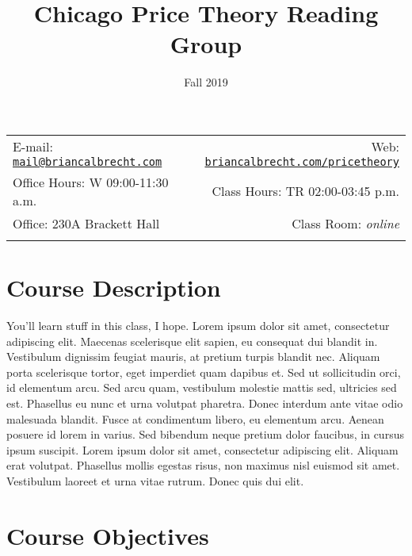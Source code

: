 \documentclass[11pt,]{article}
\title{Chicago Price Theory Reading Group}
\date{Fall 2019}
\begin{document}
  

		\maketitle
		
	
		\thispagestyle{firststyle}



	\noindent \begin{tabular*}{\textwidth}{ @{\extracolsep{\fill}} lr @{\extracolsep{\fill}}}


E-mail: \texttt{\href{mailto:mail@briancalbrecht.com}{\nolinkurl{mail@briancalbrecht.com}}} & Web: \href{http://briancalbrecht.com/pricetheory}{\tt briancalbrecht.com/pricetheory}\\
Office Hours: W 09:00-11:30 a.m.  &  Class Hours: TR 02:00-03:45 p.m.\\
Office: 230A Brackett Hall  & Class Room: \emph{online}\\
	&  \\
	\hline
	\end{tabular*}
	
\vspace{2mm}
	


\hypertarget{course-description}{%
\section{Course Description}\label{course-description}}

You'll learn stuff in this class, I hope. Lorem ipsum dolor sit amet, consectetur adipiscing elit. Maecenas scelerisque elit sapien, eu consequat dui blandit in. Vestibulum dignissim feugiat mauris, at pretium turpis blandit nec. Aliquam porta scelerisque tortor, eget imperdiet quam dapibus et. Sed ut sollicitudin orci, id elementum arcu. Sed arcu quam, vestibulum molestie mattis sed, ultricies sed est. Phasellus eu nunc et urna volutpat pharetra. Donec interdum ante vitae odio malesuada blandit. Fusce at condimentum libero, eu elementum arcu. Aenean posuere id lorem in varius. Sed bibendum neque pretium dolor faucibus, in cursus ipsum suscipit. Lorem ipsum dolor sit amet, consectetur adipiscing elit. Aliquam erat volutpat. Phasellus mollis egestas risus, non maximus nisl euismod sit amet. Vestibulum laoreet et urna vitae rutrum. Donec quis dui elit.

\hypertarget{course-objectives}{%
\section{Course Objectives}\label{course-objectives}}
\end{document}
